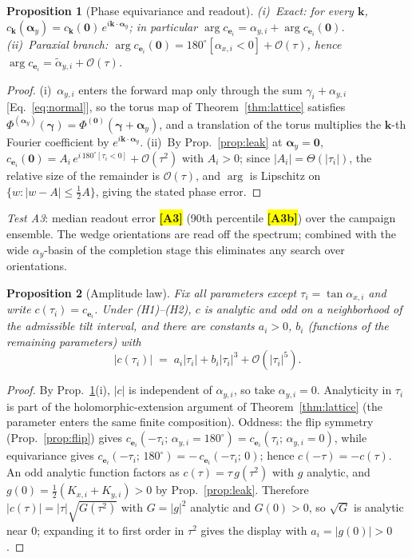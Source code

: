 \documentclass[twocolumn,preprintnumbers,amsmath,amssymb,pra,floatfix]{revtex4-2}
\newcommand{\vect}[1]{\bm{#1}}
\newcommand{\bigO}{\mathcal{O}}
\newtheorem{proposition}{Proposition}
\newcommand{\PH}[1]{\colorbox{yellow}{\textbf{\small [#1]}}}
\begin{document}
\begin{proposition}[Phase equivariance and readout]
\label{prop:phase}
(i)~\emph{Exact:} for every $\vect{k}$,
$c_{\vect{k}}(\vect{\alpha}_y)
=c_{\vect{k}}(\vect{0})\,e^{i\vect{k}\cdot\vect{\alpha}_y}$; in
particular
$\arg c_{\vect{e}_i}=\alpha_{y,i}+\arg c_{\vect{e}_i}(\vect{0})$.
(ii)~\emph{Paraxial branch:}
$\arg c_{\vect{e}_i}(\vect{0})=180^\circ[\alpha_{x,i}<0]
+\bigO(\tau)$, hence
$\arg c_{\vect{e}_i}=\tilde\alpha_{y,i}+\bigO(\tau)$.
\end{proposition}
\begin{proof}
(i)~$\alpha_{y,i}$ enters the forward map only through the sum
$\gamma_i+\alpha_{y,i}$ [Eq.~\eqref{eq:normal}], so the torus map of
Theorem~\ref{thm:lattice} satisfies
$\Phi^{(\vect{\alpha}_y)}(\vect{\gamma})
=\Phi^{(\vect{0})}(\vect{\gamma}+\vect{\alpha}_y)$, and a translation
of the torus multiplies the $\vect{k}$-th Fourier coefficient by
$e^{i\vect{k}\cdot\vect{\alpha}_y}$.
(ii)~By Prop.~\ref{prop:leak} at $\vect{\alpha}_y=\vect{0}$,
$c_{\vect{e}_i}(\vect{0})=A_i\,e^{i\,180^\circ[\tau_i<0]}
+\bigO(\tau^{2})$ with $A_i>0$; since $|A_i|=\Theta(|\tau_i|)$, the
relative size of the remainder is $\bigO(\tau)$, and $\arg$ is
Lipschitz on $\{w:|w-A|\le\tfrac12 A\}$, giving the stated phase
error.
\end{proof}

\emph{Test A3}: median readout error \PH{A3} (90th percentile
\PH{A3b}) over the campaign ensemble.  The wedge orientations are read off the
spectrum; combined with the wide $\alpha_y$-basin of the completion
stage this eliminates any search over orientations.

\begin{proposition}[Amplitude law]
\label{prop:amp}
Fix all parameters except $\tau_i=\tan\alpha_{x,i}$ and write
$c(\tau_i)=c_{\vect{e}_i}$.  Under (H1)--(H2), $c$ is analytic and
odd on a neighborhood of the admissible tilt interval, and there are
constants $a_i>0$, $b_i$ (functions of the remaining parameters)
with
\begin{equation}
  |c(\tau_i)| \;=\; a_i|\tau_i| + b_i|\tau_i|^{3}
  + \bigO(|\tau_i|^{5}).
\end{equation}
\end{proposition}
\begin{proof}
By Prop.~\ref{prop:phase}(i), $|c|$ is independent of
$\alpha_{y,i}$, so take $\alpha_{y,i}=0$.  Analyticity in $\tau_i$ is
part of the holomorphic-extension argument of
Theorem~\ref{thm:lattice} (the parameter enters the same finite
composition).  Oddness: the flip symmetry (Prop.~\ref{prop:flip})
gives $c_{\vect{e}_i}(-\tau_i;\,\alpha_{y,i}{=}180^\circ)
=c_{\vect{e}_i}(\tau_i;\,\alpha_{y,i}{=}0)$, while
equivariance gives
$c_{\vect{e}_i}(-\tau_i;\,180^\circ)
=-\,c_{\vect{e}_i}(-\tau_i;\,0)$; hence $c(-\tau)=-c(\tau)$.  An odd
analytic function factors as $c(\tau)=\tau\,g(\tau^{2})$ with $g$
analytic, and $g(0)=\tfrac12(K_{x,i}+K_{y,i})>0$ by
Prop.~\ref{prop:leak}.  Therefore
$|c(\tau)|=|\tau|\sqrt{G(\tau^{2})}$ with $G=|g|^{2}$ analytic and
$G(0)>0$, so $\sqrt{G}$ is analytic near $0$; expanding it to first
order in $\tau^{2}$ gives the display with $a_i=|g(0)|>0$.
\end{proof}
\end{document}
